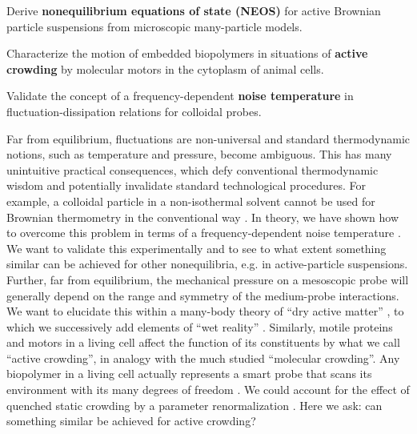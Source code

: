 \begin{workpackage}[id=WPactive,wphases=0-48,
  short=Active Particle Suspensions,%
  title=Probing active particle suspensions with colloids and polymers,
  lead=ULEI,
  ULEIRM=96,UNIPDRM=6,USTUTTRM=2]

\newrefsection

\begin{wpobjectives}
  \begin{compactitem}
  \item Derive \textbf{nonequilibrium equations of state (NEOS)} for active Brownian
  particle suspensions from microscopic many-particle models.
  \item Characterize the motion of embedded biopolymers in situations of \textbf{active
    crowding} by molecular motors in the cytoplasm of animal cells.
  \item Validate the concept of a frequency-dependent \textbf{noise temperature} in
  fluctuation-dissipation relations for colloidal probes.
  \end{compactitem}
\end{wpobjectives}

\begin{wpdescription}

Far from equilibrium, fluctuations are non-universal and standard thermodynamic notions,
such as temperature and pressure, become ambiguous.
This has many unintuitive practical consequences, which defy conventional thermodynamic
wisdom and potentially invalidate standard technological procedures.
%
For example, a colloidal particle in a non-isothermal solvent cannot be used for Brownian thermometry 
in the conventional way \cite{rings-etal:2010,kroy:2014}. In theory, we have shown how to overcome this problem
in terms of a frequency-dependent noise temperature \cite{falasco-etal:2014}.
%
We want to validate this experimentally and to see to what extent something similar can be achieved for other 
nonequilibria, e.g. in active-particle suspensions.
%
Further, far from equilibrium, the mechanical pressure on a mesoscopic probe will generally depend on the range and 
symmetry of the medium-probe interactions. 
%
We want to elucidate this within a many-body theory of ``dry active matter'' \cite{solon-etal:2015}, 
to which we successively add elements of ``wet reality'' \cite{zoettl-stark:2014}.
%
Similarly, motile proteins and motors in a living cell affect the function
of its constituents by what  we call ``active crowding'', in analogy with the much studied ``molecular crowding''. 
%
Any biopolymer in a living cell actually represents a smart probe that scans its environment with its many 
degrees of freedom \cite{otto-etal:2013}.
%
We could account for the effect of quenched static crowding by a parameter renormalization \cite{schoebl-etal:2014}.  
%
Here we ask: can something similar be achieved for active crowding?
\end{wpdescription}


\end{workpackage}

